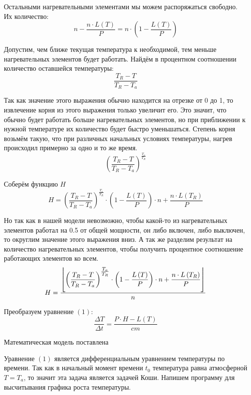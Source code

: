 \documentclass[a4paper, 14pt, titlepage, fleqn]{extarticle}
\DeclarePairedDelimiter\floor{\lfloor}{\rfloor}
\begin{document}
            Остальными нагревательными элементами мы можем распоряжаться свободно. Их количество:
            \[ n - \dfrac{n \cdot L\left(T\right)}{P} = n \cdot \left( 1 - \dfrac{L\left(T\right)}{P} \right) \]

            Допустим, чем ближе текущая температура к необходимой, тем меньше нагревательных элементов будет работать.
            Найдём в процентном соотношении количество оставшейся температуры:
            \[ \dfrac{T_R - T}{T_R - T_a} \]

            Так как значение этого выражения обычно находится на отрезке от 0 до 1, то извлечение корня из этого выражения только увеличит его.
            Это значит, что обычно будет работать больше нагревательных элементов, но при приближении к нужной температуре их количество будет быстро уменьшаться.
            Степень корня возьмём такую, что при различных начальных условиях температуры, нагрев происходил примерно за одно и то же время.
            \[ \left({\dfrac{T_R - T}{T_R - T_a}}\right)^{\tfrac{T_a}{T_R}} \] 
            
            Соберём функцию $H$
            \[ H = \left({\dfrac{T_R - T}{T_R - T_a}}\right)^{\tfrac{T_a}{T_R}} \cdot \left( 1 - \dfrac{L\left(T\right)}{P} \right) \cdot n + \dfrac{n \cdot L\left( T_R \right)}{P} \]
            
            Но так как в нашей модели невозможно, чтобы какой-то из нагревательных элементов работал на 0.5 от общей мощности, он либо включен, либо выключен, то округлим значение этого выражения вниз.
            А так же разделим результат на количество нагревательных элементов, чтобы получить процентное соотношение работающих элементов ко всем.
            \[ H = \dfrac { \floor*{\left({\dfrac{T_R - T}{T_R - T_a}}\right)^{\tfrac{T_a}{T_R}} \cdot \left( 1 - \dfrac{L\left(T\right)}{P} \right) \cdot n + \dfrac{n \cdot L\left( T_R \right)}{P}} }{n} \]

            Преобразуем уравнение $\left(1\right)$:
            \begin{equation}
                \dfrac{\Delta T}{\Delta t} = \dfrac{P \cdot H - L\left( T \right)}{c m}
            \end{equation}

            Математическая модель поставлена


            Уравнение $\left(1\right)$ является дифференциальным уравнением температуры по времени.
            Так как в начальный момент времени $t_0$ температура равна атмосферной $T = T_a$, то значит эта задача является задачей Коши.
            Напишем программу для высчитывания графика роста температуры. 
\end{document}
